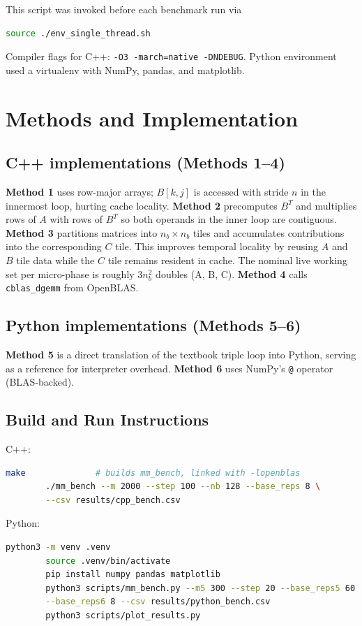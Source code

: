 \documentclass[11pt,a4paper]{article}
\begin{document}
	This script was invoked before each benchmark run via
	\begin{lstlisting}[language=bash]
		source ./env_single_thread.sh
	\end{lstlisting}
	
	
	Compiler flags for C++: \verb|-O3 -march=native -DNDEBUG|. Python environment used a virtualenv with NumPy, pandas, and matplotlib.
	
	
	\section{Methods and Implementation}
	\subsection{C++ implementations (Methods 1–4)}
	\textbf{Method 1} uses row-major arrays; $B[k,j]$ is accessed with stride $n$ in the innermost loop, hurting cache locality.
	\textbf{Method 2} precomputes $B^T$ and multiplies rows of $A$ with rows of $B^T$ so both operands in the inner loop are contiguous.
	\textbf{Method 3} partitions matrices into $n_b\times n_b$ tiles and accumulates contributions into the corresponding $C$ tile. This improves temporal locality by reusing $A$ and $B$ tile data while the $C$ tile remains resident in cache. The nominal live working set per micro-phase is roughly $3n_b^2$ doubles (A, B, C).
	\textbf{Method 4} calls \verb|cblas_dgemm| from OpenBLAS.
	
	\subsection{Python implementations (Methods 5–6)}
	\textbf{Method 5} is a direct translation of the textbook triple loop into Python, serving as a reference for interpreter overhead.
	\textbf{Method 6} uses NumPy’s \verb|@| operator (BLAS-backed).
	
	\subsection{Build and Run Instructions}
	C++:
	\begin{lstlisting}[language=bash]
		make              # builds mm_bench, linked with -lopenblas
		./mm_bench --m 2000 --step 100 --nb 128 --base_reps 8 \
		--csv results/cpp_bench.csv
	\end{lstlisting}
	Python:
	\begin{lstlisting}[language=bash]
		python3 -m venv .venv
		source .venv/bin/activate
		pip install numpy pandas matplotlib
		python3 scripts/mm_bench.py --m5 300 --step 20 --base_reps5 60 \
		--base_reps6 8 --csv results/python_bench.csv
		python3 scripts/plot_results.py
	\end{lstlisting}
	
\end{document}
